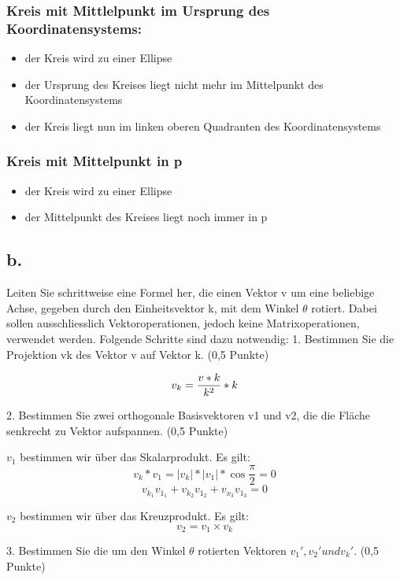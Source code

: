 \documentclass[12pt]{scrreprt}
\begin{document}
\subsubsection*{Kreis mit Mittlelpunkt im Ursprung des Koordinatensystems:}

\begin{itemize}
  \item der Kreis wird zu einer Ellipse
  \item der Ursprung des Kreises liegt nicht mehr im Mittelpunkt des
Koordinatensystems
  \item der Kreis liegt nun im linken oberen Quadranten des Koordinatensystems
\end{itemize}

\subsubsection*{Kreis mit Mittelpunkt in p}

\begin{itemize}
  \item der Kreis wird zu einer Ellipse
  \item der Mittelpunkt des Kreises liegt noch immer in p
\end{itemize}


\subsection*{b.}

Leiten Sie schrittweise eine Formel her, die einen Vektor v um eine beliebige Achse, gegeben durch den
Einheitsvektor k, mit dem Winkel \(\theta\) rotiert. Dabei sollen ausschliesslich Vektoroperationen, jedoch keine
Matrixoperationen, verwendet werden. Folgende Schritte sind dazu notwendig:
1. Bestimmen Sie die Projektion vk des Vektor v auf Vektor k. (0,5 Punkte)

\[
 v_k = {v * k \over k^2} * k
\]

2. Bestimmen Sie zwei orthogonale Basisvektoren v1 und v2, die die Fläche senkrecht zu Vektor
aufspannen. (0,5 Punkte)

\(v_1\) bestimmen wir über das Skalarprodukt. Es gilt:
\[
v_k * v_1 = |v_k| * |v_1| * \cos\frac{\pi}{2} = 0
\]
\[
v_{k_1}v_{1_1} + v_{k_2}v_{1_2} + v_{x_3}v_{1_3} = 0
\]

\(v_2\) bestimmen wir über das Kreuzprodukt. Es gilt:
\[
v_2 = v_1 \times v_k
\]

3. Bestimmen Sie die um den Winkel \(\theta\) rotierten Vektoren \(v_1', v_2' und v_k'\). (0,5 Punkte)
\end{document}
